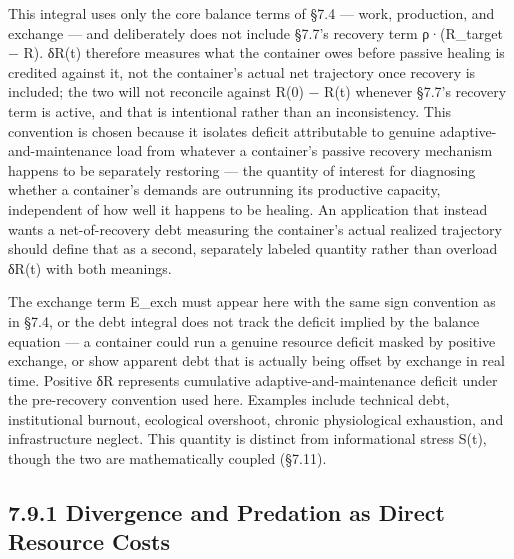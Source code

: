 \documentclass[
]{article}
\begin{document}
This integral uses only the core balance terms of §7.4 --- work,
production, and exchange --- and deliberately does not include §7.7's
recovery term ρ·(R\_target − R). δR(t) therefore measures what the
container owes before passive healing is credited against it, not the
container's actual net trajectory once recovery is included; the two
will not reconcile against R(0) − R(t) whenever §7.7's recovery term is
active, and that is intentional rather than an inconsistency. This
convention is chosen because it isolates deficit attributable to genuine
adaptive-and-maintenance load from whatever a container's passive
recovery mechanism happens to be separately restoring --- the quantity
of interest for diagnosing whether a container's demands are outrunning
its productive capacity, independent of how well it happens to be
healing. An application that instead wants a net-of-recovery debt
measuring the container's actual realized trajectory should define that
as a second, separately labeled quantity rather than overload δR(t) with
both meanings.

The exchange term E\_exch must appear here with the same sign convention
as in §7.4, or the debt integral does not track the deficit implied by
the balance equation --- a container could run a genuine resource
deficit masked by positive exchange, or show apparent debt that is
actually being offset by exchange in real time. Positive δR represents
cumulative adaptive-and-maintenance deficit under the pre-recovery
convention used here. Examples include technical debt, institutional
burnout, ecological overshoot, chronic physiological exhaustion, and
infrastructure neglect. This quantity is distinct from informational
stress S(t), though the two are mathematically coupled (§7.11).

\hypertarget{divergence-and-predation-as-direct-resource-costs}{%
\subsection{7.9.1 Divergence and Predation as Direct Resource
Costs}\label{divergence-and-predation-as-direct-resource-costs}}
\end{document}
